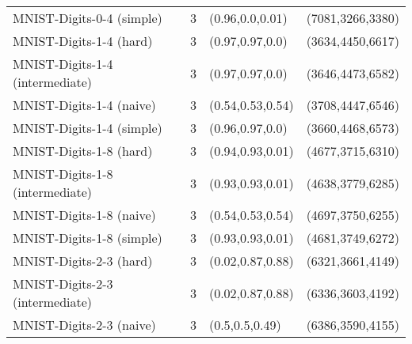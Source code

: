 \begin{tabular}{llll}
                       MNIST-Digits-0-4 (simple) &              3 &                                     (0.96,0.0,0.01) &                                               (7081,3266,3380) \\
                         MNIST-Digits-1-4 (hard) &              3 &                                     (0.97,0.97,0.0) &                                               (3634,4450,6617) \\
                 MNIST-Digits-1-4 (intermediate) &              3 &                                     (0.97,0.97,0.0) &                                               (3646,4473,6582) \\
                        MNIST-Digits-1-4 (naive) &              3 &                                    (0.54,0.53,0.54) &                                               (3708,4447,6546) \\
                       MNIST-Digits-1-4 (simple) &              3 &                                     (0.96,0.97,0.0) &                                               (3660,4468,6573) \\
                         MNIST-Digits-1-8 (hard) &              3 &                                    (0.94,0.93,0.01) &                                               (4677,3715,6310) \\
                 MNIST-Digits-1-8 (intermediate) &              3 &                                    (0.93,0.93,0.01) &                                               (4638,3779,6285) \\
                        MNIST-Digits-1-8 (naive) &              3 &                                    (0.54,0.53,0.54) &                                               (4697,3750,6255) \\
                       MNIST-Digits-1-8 (simple) &              3 &                                    (0.93,0.93,0.01) &                                               (4681,3749,6272) \\
                         MNIST-Digits-2-3 (hard) &              3 &                                    (0.02,0.87,0.88) &                                               (6321,3661,4149) \\
                 MNIST-Digits-2-3 (intermediate) &              3 &                                    (0.02,0.87,0.88) &                                               (6336,3603,4192) \\
                        MNIST-Digits-2-3 (naive) &              3 &                                      (0.5,0.5,0.49) &                                               (6386,3590,4155) \\

\end{tabular}
